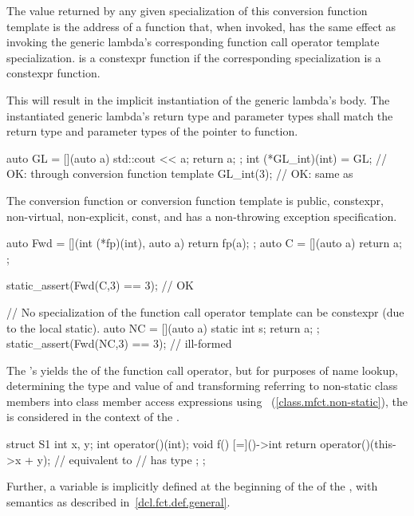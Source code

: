 \pnum
The value returned by any given specialization of this conversion function
template is the address of a function  that, when invoked, has the same
effect as invoking the generic lambda's corresponding function call operator
template specialization.
 is a constexpr function
if the corresponding specialization is a constexpr function.
\begin{note}
This will result in the implicit instantiation of the generic lambda's body.
The instantiated generic lambda's return type and parameter types shall match
the return type and parameter types of the pointer to function.
\end{note}
\begin{example}
\begin{codeblock}
auto GL = [](auto a) { std::cout << a; return a; };
int (*GL_int)(int) = GL;  // OK: through conversion function template
GL_int(3);                // OK: same as 
\end{codeblock}
\end{example}

\pnum
The conversion function or conversion function template is public,
constexpr, non-virtual, non-explicit, const, and has a non-throwing exception
specification.
\begin{example}
\begin{codeblock}
auto Fwd = [](int (*fp)(int), auto a) { return fp(a); };
auto C = [](auto a) { return a; };

static_assert(Fwd(C,3) == 3); // OK

// No specialization of the function call operator template can be constexpr (due to the local static).
auto NC = [](auto a) { static int s; return a; };
static_assert(Fwd(NC,3) == 3); // ill-formed
\end{codeblock}
\end{example}

\pnum
The 's  yields the
 of the function call operator, but for
purposes of name lookup, determining the type and value of
 and transforming 
referring to non-static class members into class member access expressions using
~(\ref{class.mfct.non-static}), the  is
considered in the context of the . \begin{example}

\begin{codeblock}
struct S1 {
  int x, y;
  int operator()(int);
  void f() {
    [=]()->int {
      return operator()(this->x + y); // equivalent to 
                                      //  has type 
    };
  }
};
\end{codeblock}
\end{example}
Further, a variable  is implicitly defined at the beginning of
the  of the ,
with semantics as described in~\ref{dcl.fct.def.general}.

